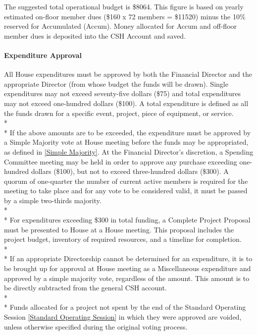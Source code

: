 \documentclass{article}
\newcommand{\asubsubsection}[1]{\paragraph{#1} \label{#1}}
\begin{document}
The suggested total operational budget is \$8064.
This figure is based on yearly estimated on-floor member dues (\$160 x 72 members = \$11520) minus the 10\% reserved for Accumulated (Accum).
Money allocated for Accum and off-floor member dues is deposited into the CSH Account and saved.

\asubsubsection{Expenditure Approval}
All House expenditures must be approved by both the Financial Director and the appropriate Director (from whose budget the funds will be drawn).
Single expenditures may not exceed seventy-five dollars (\$75) and total expenditures may not exceed one-hundred dollars (\$100).
A total expenditure is defined as all the funds drawn for a specific event, project, piece of equipment, or service.
\\* \\*
If the above amounts are to be exceeded, the expenditure must be approved by a Simple Majority vote at House meeting before the funds may be appropriated, as defined in \ref{Simple Majority}.
At the Financial Director's discretion, a Spending Committee meeting may be held in order to approve any purchase exceeding one-hundred dollars (\$100), but not to exceed three-hundred dollars (\$300).
A quorum of one-quarter the number of current active members is required for the meeting to take place and for any vote to be considered valid, it must be passed by a simple two-thirds majority.
\\*\\*
For expenditures exceeding \$300 in total funding, a Complete Project Proposal must be presented to House at a House meeting.
This proposal includes the project budget, inventory of required resources, and a timeline for completion.
\\* \\*
If an appropriate Directorship cannot be determined for an expenditure, it is to be brought up for approval at House meeting as a Miscellaneous expenditure and approved by a simple majority vote, regardless of the amount.
This amount is to be directly subtracted from the general CSH account.
\\* \\*
Funds allocated for a project not spent by the end of the Standard Operating Session \ref{Standard Operating Session} in which they were approved are voided, unless otherwise specified during the original voting process.
\end{document}
